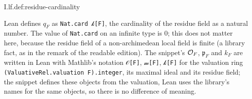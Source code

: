 \begin{definition}
\end{definition}
\begin{tfformal}{I.lf.def:residue-cardinality}
\begin{tffidelity}
Lean defines $q_F$ as \texttt{Nat.card 𝓀[F]}, the cardinality of the residue field as a natural number. The value of \texttt{Nat.card} on an infinite type is $0$; this does not matter here, because the residue field of a non-archimedean local field is finite (a library fact, as in the remark of the readable edition). The snippet's $\mathcal{O}_F$, $\mathfrak p_F$ and $k_F$ are written in Lean with Mathlib's notation \texttt{𝒪[F]}, \texttt{𝓂[F]}, \texttt{𝓀[F]} for the valuation ring \texttt{(ValuativeRel.valuation F).integer}, its maximal ideal and its residue field; the snippet defines these objects from the valuation, Lean uses the library's names for the same objects, so there is no difference of meaning.
\end{tffidelity}
\end{tfformal}

